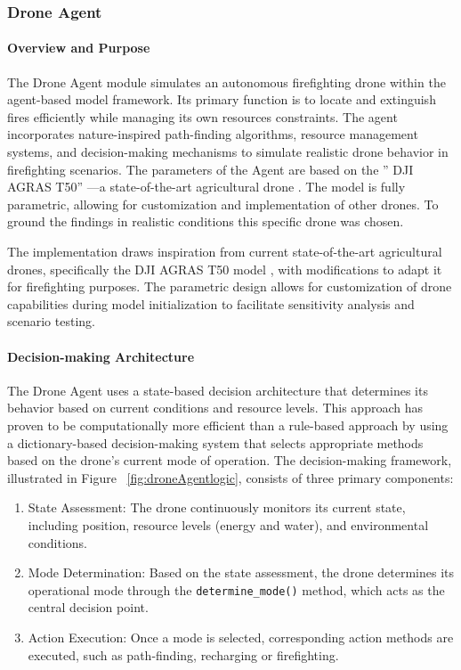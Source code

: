 \documentclass[twoside]{article}
\begin{document}
\subsubsection{Drone Agent}
\label{sec:DroneAgent}

\paragraph{Overview and Purpose} The Drone Agent module simulates an autonomous firefighting drone within the agent-based model framework. Its primary function is to locate and extinguish fires efficiently while managing its own resources constraints. The agent incorporates nature-inspired path-finding algorithms, resource management systems, and decision-making mechanisms to simulate realistic drone behavior in firefighting scenarios.
The parameters of the Agent are based on the '' DJI AGRAS T50'' —a state-of-the-art agricultural drone \citep{DJIAGRAST50}. The model is fully parametric, allowing for customization and implementation of other drones. To ground the findings in realistic conditions this specific drone was chosen.

The implementation draws inspiration from current state-of-the-art agricultural drones, specifically the DJI AGRAS T50 model \citep{DJIAGRAST50}, with modifications to adapt it for firefighting purposes. The parametric design allows for customization of drone capabilities during model initialization to facilitate sensitivity analysis and scenario testing.

\paragraph{Decision-making Architecture} The Drone Agent uses a state-based decision architecture that determines its behavior based on current conditions and resource levels. This approach has proven to be computationally more efficient than a rule-based approach by using a dictionary-based decision-making system that selects appropriate methods based on the drone's current mode of operation.
The decision-making framework, illustrated in Figure ~\ref{fig:droneAgentlogic}, consists of three primary components:
\begin{enumerate}
  \item {State Assessment:} The drone continuously monitors its current state, including position, resource levels (energy and water), and environmental conditions.
  
  \item{Mode Determination:} Based on the state assessment, the drone determines its operational mode through the \texttt{determine\_mode()} method, which acts as the central decision point.
  
  \item {Action Execution:} Once a mode is selected, corresponding action methods are executed, such as path-finding, recharging or firefighting.

\end{enumerate}
\end{document}
